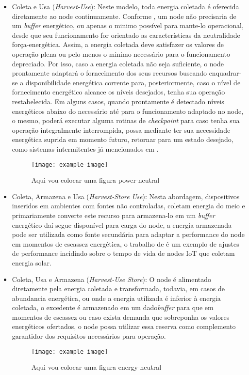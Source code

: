 \begin{itemize}
    \item Coleta e Usa (\textit{Harvest-Use}): Neste modelo, toda energia coletada é oferecida diretamente ao node continuamente. Conforme \cite{merrett_energy-driven_2017}, um node não precisaria de um \textit{buffer} energético, ou apenas o minimo possível para mante-lo operacional, desde que seu funcionamento for orientado as características da neutralidade força-energética. Assim, a energia coletada deve satisfazer os valores de operação plena ou pelo menos o minimo necessário para o funcionamento depreciado. Por isso, caso a energia coletada não seja suficiente, o node prontamente adaptará o fornecimento dos seus recursos buscando enquadrar-se a disponibilidade energética corrente para, posteriormente, caso o nível de fornecimento energético alcance os níveis desejados, tenha sua operação restabelecida. Em alguns casos, quando prontamente é detectado níveis energéticos abaixo do necessário até para o funcionamento adaptado no node, o mesmo, poderá executar alguma rotinas de \textit{checkpoint} para caso tenha sua operação integralmente interrompida, possa mediante ter sua necessidade energética suprida em momento futuro, retornar para um estado desejado, como sistemas intermitentes já mencionados em \cite{sliper_energy-driven_2020}.
    
	\begin{figure}[h]
			\centering
			\noindent\texttt{[image: example-image]} 
			\caption{Aqui vou colocar uma figura power-neutral}	
	\end{figure}   
    
    \item Coleta, Armazena e Usa (\textit{Harvest-Store Use}): Nesta abordagem, dispositivos inseridos em ambientes com fontes não controladas, coletam energia do meio e primariamente converte este recurso para armazena-lo em um \textit{buffer} energético daí segue disponível para carga do node, a energia armazenada pode ser utilizada como fonte secundária para adaptar a performance do node em momentos de escassez energética, o trabalho de \cite{Lee2018-iz} é um exemplo de ajustes de performance incidindo sobre o tempo de vida de nodes \ac{IoT} que coletam energia solar.
    \item Coleta, Usa e Armazena (\textit{Harvest-Use Store}): O node é alimentado diretamente pela energia coletada e transformada, todavia, em casos de abundancia energética, ou onde a energia utilizada é inferior à energia coletada, o excedente é armazenado em um dado\textit{buffer} para que em momentos de escassez ou caso exista demanda que sobreponha os valores energéticos ofertados, o node possa utilizar essa reserva como complemento garantidor dos requisitos necessários para operação.
    
    \begin{figure}[h]
    	\centering
    	\noindent\texttt{[image: example-image]} 
    	\caption{Aqui vou colocar uma figura energy-neutral}	
   	\end{figure}  
    
\end{itemize}

